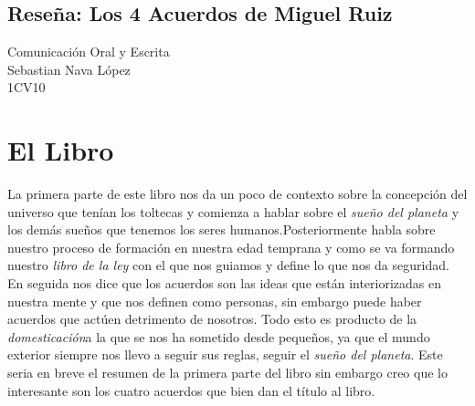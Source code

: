 \documentclass[a4paper,12pt]{article}
\newcommand{\titlehomework}[4]{\begin{center}\section*{#4}{\large #2}\\#1\\#3\\[2ex]\end{center}}
\begin{document}
\titlehomework{Sebastian Nava López}{Comunicación Oral y Escrita}{1CV10}{Reseña: Los 4 Acuerdos de
Miguel Ruiz}
\section*{El Libro}
La primera parte de este libro nos da un poco de contexto sobre la concepción del
universo que tenían los toltecas y comienza a hablar sobre el \textit{sueño del planeta} y los
demás sueños que tenemos los seres humanos.Posteriormente habla sobre nuestro proceso de
formación en nuestra edad temprana y como se va formando nuestro \textit{libro de la
ley} con el que nos guiamos y define lo que nos da seguridad. En seguida nos dice que los
acuerdos son las ideas que están interiorizadas en nuestra mente y que nos definen como personas,
sin embargo puede haber acuerdos que actúen detrimento de nosotros.
Todo esto es producto de la \textit{domesticación}a la que se nos ha sometido desde pequeños, ya que el
mundo exterior siempre nos llevo a seguir sus reglas, seguir el \textit{sueño del planeta}.
Este seria en breve el resumen de la primera parte del libro sin embargo creo que lo
interesante son los cuatro acuerdos que bien dan el título al libro.
\end{document}
